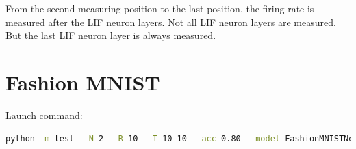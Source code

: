     From the second measuring position to the last position, the firing rate is measured after the LIF neuron layers. Not all LIF neuron layers are measured. But the last LIF neuron layer is always measured. 

    \section{Fashion MNIST}
    \label{appendix:firerate_fashion_mnist}
        Launch command: 
        \begin{lstlisting}[language=Bash, basicstyle=\small, breaklines=true]
python -m test --N 2 --R 10 --T 10 10 --acc 0.80 --model FashionMNISTNet --data-path /scratch/zyi/codeSpace/data --dataset FashionMNIST --batch-size 128 --opt adam --lr 2e-3 --lr-scheduler none --epochs 50 --lr-warmup-epochs 0 --output-dir /scratch/zyi/codeSpace/MultibitSpikes/firerate --mixup-alpha 0.0 --cutmix-alpha 0.0 --label-smoothing 0.0 --disable-amp
        \end{lstlisting}

